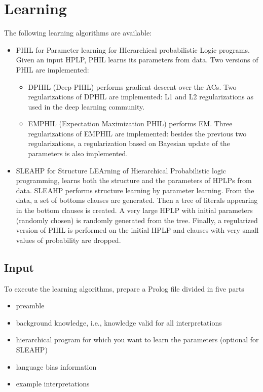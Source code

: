 \documentclass[letterpaper,10pt,english]{sphinxmanual}
\begin{document}
\chapter{Learning}
\label{\detokenize{index:learning}}
The following learning algorithms are available:
\begin{itemize}
\item {} 
PHIL for Parameter learning for HIerarchical probabilistic Logic programs. Given an input HPLP, PHIL learns its parameters from data. Two versions of PHIL are implemented:
\begin{itemize}
\item {} 
DPHIL (Deep PHIL)  performs gradient descent over the ACs. Two regularizations of DPHIL are implemented: L1 and L2 regularizations as used in the deep learning community.

\item {} 
EMPHIL (Expectation Maximization PHIL)  performs EM. Three regularizations of EMPHIL are implemented: besides the previous two regularizations, a regularization based on Bayesian update of the parameters is also implemented.

\end{itemize}

\item {} 
SLEAHP for Structure LEArning of Hierarchical Probabilistic logic programming, learns both the structure and the parameters of HPLPs from data. SLEAHP performs structure learning by parameter learning. From the data, a set of bottoms clauses are generated. Then a tree of literals appearing in the bottom clauses is created. A very large HPLP with initial parameters (randomly chosen) is randomly generated from the tree. Finally, a regularized version of PHIL is performed on the initial HPLP and clauses with very small values of probability are dropped.

\end{itemize}


\section{Input}
\label{\detokenize{index:input}}
To execute the learning algorithms, prepare a Prolog file divided in five parts
\begin{itemize}
\item {} 
preamble

\item {} 
background knowledge, i.e., knowledge valid for all interpretations

\item {} 
hierarchical program for which you want to learn the parameters (optional for SLEAHP)

\item {} 
language bias information

\item {} 
example interpretations

\end{itemize}
\end{document}
